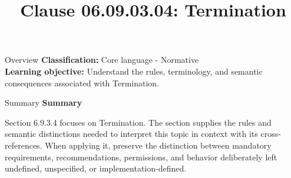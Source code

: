\documentclass[10pt,letterpaper]{article}
\title{Clause 06.09.03.04: Termination}
\author{}
\date{}
\begin{document}
\maketitle
\begin{CornellOverviewBox}{Overview}
\textbf{Classification:} Core language - Normative\\[2pt]
\textbf{Learning objective:} Understand the rules, terminology, and semantic consequences associated with Termination.
\end{CornellOverviewBox}\begin{CornellSummaryBox}{Summary}
{\sffamily\bfseries\color{Accent} Summary}\par\vspace{3pt}Section 6.9.3.4 focuses on Termination. The section supplies the rules and semantic distinctions needed to interpret this topic in context with its cross-references. When applying it, preserve the distinction between mandatory requirements, recommendations, permissions, and behavior deliberately left undefined, unspecified, or implementation-defined.
\end{CornellSummaryBox}
\end{document}
